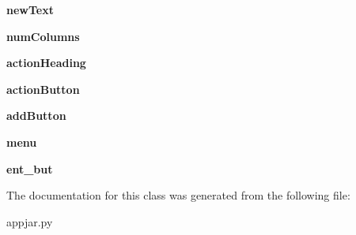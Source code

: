 \begin{DoxyCompactItemize}
{\bfseries new\+Text}
\item 
\mbox{\label{class_python_01_g_u_i_1_1appjar_1_1_simple_table_acd418f50fe59139afd830d2baa5726d9}} 
{\bfseries num\+Columns}
\item 
\mbox{\label{class_python_01_g_u_i_1_1appjar_1_1_simple_table_aef243fd5e3ac23ba289f3f1669348c41}} 
{\bfseries action\+Heading}
\item 
\mbox{\label{class_python_01_g_u_i_1_1appjar_1_1_simple_table_a630fc9f43c0f069c17bdfeea87264602}} 
{\bfseries action\+Button}
\item 
\mbox{\label{class_python_01_g_u_i_1_1appjar_1_1_simple_table_a08e32da9a38517778f8348a82f25afa1}} 
{\bfseries add\+Button}
\item 
\mbox{\label{class_python_01_g_u_i_1_1appjar_1_1_simple_table_a7bfa1da2fbd9203b5a4cbd8e22eacff2}} 
{\bfseries menu}
\item 
\mbox{\label{class_python_01_g_u_i_1_1appjar_1_1_simple_table_a40e6ec4969b7eaa46c7ae8f19c6be64e}} 
{\bfseries ent\+\_\+but}
\end{DoxyCompactItemize}


The documentation for this class was generated from the following file\+:\begin{DoxyCompactItemize}
\item 
appjar.\+py\end{DoxyCompactItemize}
